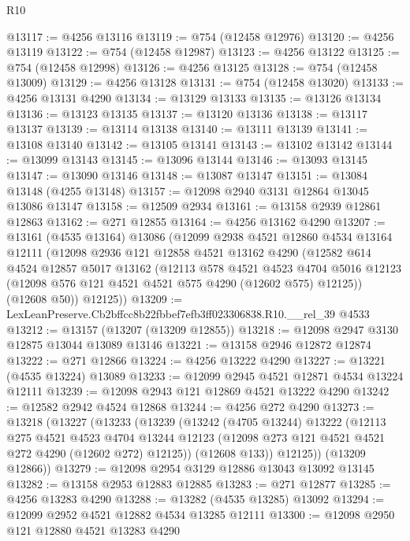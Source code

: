 \begin{lexlean}{R10}
\begin{coremodule}
@13117 := @4256 @13116
@13119 := @754 (@12458 @12976)
@13120 := @4256 @13119
@13122 := @754 (@12458 @12987)
@13123 := @4256 @13122
@13125 := @754 (@12458 @12998)
@13126 := @4256 @13125
@13128 := @754 (@12458 @13009)
@13129 := @4256 @13128
@13131 := @754 (@12458 @13020)
@13133 := @4256 @13131 @4290
@13134 := @13129 @13133
@13135 := @13126 @13134
@13136 := @13123 @13135
@13137 := @13120 @13136
@13138 := @13117 @13137
@13139 := @13114 @13138
@13140 := @13111 @13139
@13141 := @13108 @13140
@13142 := @13105 @13141
@13143 := @13102 @13142
@13144 := @13099 @13143
@13145 := @13096 @13144
@13146 := @13093 @13145
@13147 := @13090 @13146
@13148 := @13087 @13147
@13151 := @13084 @13148 (@4255 @13148)
@13157 := @12098 @2940 @3131 @12864 @13045 @13086 @13147
@13158 := @12509 @2934
@13161 := @13158 @2939 @12861 @12863
@13162 := @271 @12855
@13164 := @4256 @13162 @4290
@13207 := @13161
    (@4535 @13164)
    @13086
    (@12099
      @2938
      @4521
      @12860
      @4534
      @13164
      @12111
      (@12098
        @2936
        @121
        @12858
        @4521
        @13162
        @4290
        (@12582
          @614
          @4524
          @12857
          @5017
          @13162
          (@12113
            @578
            @4521
            @4523
            @4704
            @5016
            @12123
            (@12098 @576 @121 @4521 @4521 @575 @4290 (@12602 @575) @12125))
          (@12608 @50))
        @12125))
@13209 := LexLeanPreserve.Cb2bffcc8b22fbbef7efb3ff023306838.R10.__rel_39 @4533
@13212 := @13157 (@13207 (@13209 @12855))
@13218 := @12098 @2947 @3130 @12875 @13044 @13089 @13146
@13221 := @13158 @2946 @12872 @12874
@13222 := @271 @12866
@13224 := @4256 @13222 @4290
@13227 := @13221 (@4535 @13224) @13089
@13233 := @12099 @2945 @4521 @12871 @4534 @13224 @12111
@13239 := @12098 @2943 @121 @12869 @4521 @13222 @4290
@13242 := @12582 @2942 @4524 @12868
@13244 := @4256 @272 @4290
@13273 := @13218
    (@13227
      (@13233
        (@13239
          (@13242
            (@4705 @13244)
            @13222
            (@12113
              @275
              @4521
              @4523
              @4704
              @13244
              @12123
              (@12098 @273 @121 @4521 @4521 @272 @4290 (@12602 @272) @12125))
            (@12608 @133))
          @12125))
      (@13209 @12866))
@13279 := @12098 @2954 @3129 @12886 @13043 @13092 @13145
@13282 := @13158 @2953 @12883 @12885
@13283 := @271 @12877
@13285 := @4256 @13283 @4290
@13288 := @13282 (@4535 @13285) @13092
@13294 := @12099 @2952 @4521 @12882 @4534 @13285 @12111
@13300 := @12098 @2950 @121 @12880 @4521 @13283 @4290

\end{coremodule}
\end{lexlean}
